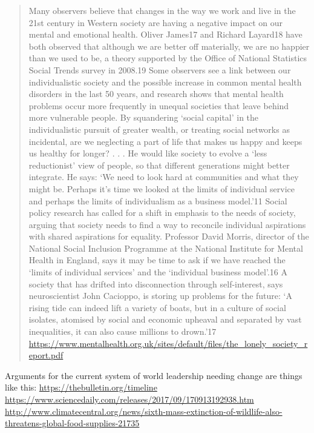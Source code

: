 \documentclass[11pt]{article}
\begin{document}
\begin{quote}
Many observers believe that changes in the way we work and live in the 21st century in
Western society are having a negative impact on our mental and emotional health. Oliver
James17 and Richard Layard18 have both observed that although we are better off materially,
we are no happier than we used to be, a theory supported by the Office of National Statistics
Social Trends survey in 2008.19 Some observers see a link between our individualistic society
and the possible increase in common mental health disorders in the last 50 years, and
research shows that mental health problems occur more frequently in unequal societies that
leave behind more vulnerable people. By squandering ‘social capital’ in the individualistic
pursuit of greater wealth, or treating social networks as incidental, are we neglecting a part
of life that makes us happy and keeps us healthy for longer? 
. . . 
He would like society to evolve a ‘less reductionist’ view of people, so that different
generations might better integrate. He says: ‘We need to look hard at communities and what
they might be. Perhaps it’s time we looked at the limits of individual service and perhaps the
limits of individualism as a business model.’11
Social policy research has called for a shift in emphasis to the needs of society, arguing that
society needs to find a way to reconcile individual aspirations with shared aspirations for
equality. Professor David Morris, director of the National Social Inclusion Programme at the
National Institute for Mental Health in England, says it may be time to ask if we have reached
the ‘limits of individual services’ and the ‘individual business model’.16 A society that has
drifted into disconnection through self-interest, says neuroscientist John Cacioppo, is storing
up problems for the future: ‘A rising tide can indeed lift a variety of boats, but in a culture of
social isolates, atomised by social and economic upheaval and separated by vast inequalities,
it can also cause millions to drown.’17 \url{https://www.mentalhealth.org.uk/sites/default/files/the_lonely_society_report.pdf}
\end{quote}
Arguments for the current system of world leadership needing change are things like this: \url{https://thebulletin.org/timeline} \newline \url{https://www.sciencedaily.com/releases/2017/09/170913192938.htm} \newline \url{http://www.climatecentral.org/news/sixth-mass-extinction-of-wildlife-also-threatens-global-food-supplies-21735}
\end{document}
